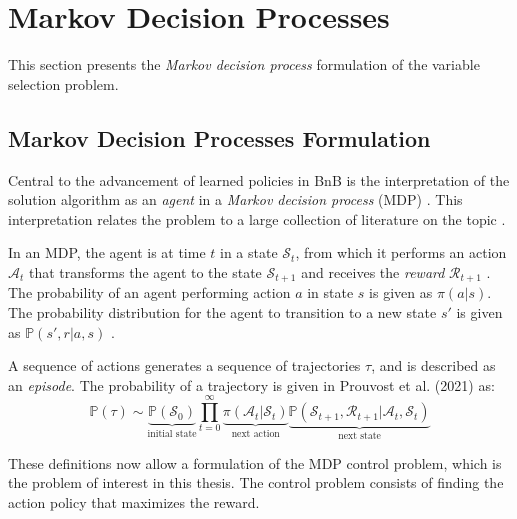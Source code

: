\section{Markov Decision Processes}\label{sec:back_mdp}

This section presents the \textit{Markov decision process} formulation of the variable selection problem. 


\subsection{Markov Decision Processes Formulation}\label{ssec:mdp}

Central to the advancement of learned policies in \gls{BnB} is the interpretation of the solution algorithm as an \textit{agent} in a \textit{Markov decision process} (\gls{MDP}) \cite{gasse2019exact}. This interpretation relates the problem to a large collection of literature on the topic \cite{howard1960dynamic}.

In an \gls{MDP}, the agent is at time $t$ in a state $\mathcal{S}_t$, from which it performs an action $\mathcal{A}_t$ that transforms the agent to the state $\mathcal{S}_{t+1}$ and receives the \textit{reward} $\mathcal{R}_{t+1}$ \cite{prouvost2021ecole}. The probability of an agent performing action $a$ in state $s$ is given as $\pi (a | s)$. The probability distribution for the agent to transition to a new state $s'$ is given as $\mathbb{P}(s', r | a, s)$ \cite{prouvost2021ecole}. 

 
A sequence of actions generates a sequence of trajectories $\tau$, and is described as an \textit{episode}. The probability of a trajectory is given in Prouvost et al. (2021) \cite{prouvost2020ecole} as:
\begin{equation}
    \mathbb{P}(\tau) \sim \underbrace{\mathbb{P}(\mathcal{S}_0)}_{\text{initial state}}
\prod_{t=0}^\infty \underbrace{\pi(\mathcal{A}_t | \mathcal{S}_t)}_{\text{next action}}
\underbrace{\mathbb{P}(\mathcal{S}_{t+1}, \mathcal{R}_{t+1} | \mathcal{A}_t, \mathcal{S}_t)}_{\text{next state}}
\end{equation}

These definitions now allow a formulation of the \gls{MDP} control problem, which is the problem of interest in this thesis. The control problem consists of finding the action policy that maximizes the reward. %



